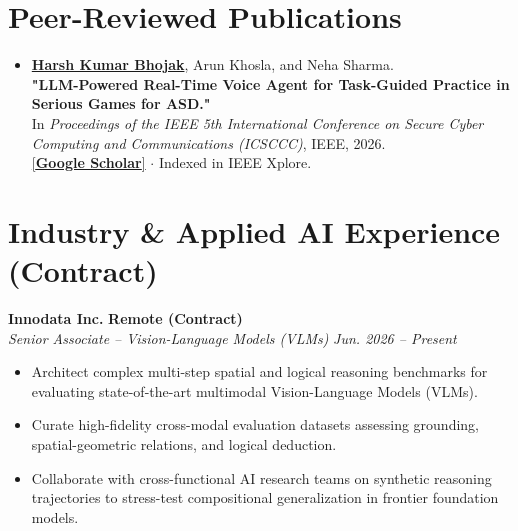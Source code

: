 \documentclass[10pt,a4paper]{article}
\begin{document}
\section*{Peer-Reviewed Publications}
\begin{itemize}
    \item \underline{\textbf{Harsh Kumar Bhojak}}, Arun Khosla, and Neha Sharma. \\
    \textbf{"LLM-Powered Real-Time Voice Agent for Task-Guided Practice in Serious Games for ASD."} \\
    In \textit{Proceedings of the IEEE 5th International Conference on Secure Cyber Computing and Communications (ICSCCC)}, IEEE, 2026. \\
    \href{https://scholar.google.com/citations?user=AERr9JFapsS7cVs0AKu8EHFLM03utnpNz85mBmw8NIb3SSI81c03wESY0JJN}{[\textbf{Google Scholar}]} $\cdot$ Indexed in IEEE Xplore.
\end{itemize}

\section*{Industry \& Applied AI Experience (Contract)}

\textbf{Innodata Inc.} \hfill \textbf{Remote (Contract)} \\
\textit{Senior Associate -- Vision-Language Models (VLMs)} \hfill \textit{Jun. 2026 -- Present}
\begin{itemize}
    \item Architect complex multi-step spatial and logical reasoning benchmarks for evaluating state-of-the-art multimodal Vision-Language Models (VLMs).
    \item Curate high-fidelity cross-modal evaluation datasets assessing grounding, spatial-geometric relations, and logical deduction.
    \item Collaborate with cross-functional AI research teams on synthetic reasoning trajectories to stress-test compositional generalization in frontier foundation models.
\end{itemize}
\end{document}

